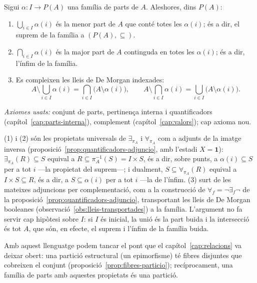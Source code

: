 \begin{proposicio}\label{prop:unio-interseccio-propietats}
Sigui \(\alpha\colon I\to P(A)\) una família de parts de \(A\). Aleshores,
dins \(P(A)\):
\begin{enumerate}
\item \(\bigcup_{i\in I}\alpha(i)\) és la menor part de \(A\) que conté totes
les \(\alpha(i)\); és a dir, el suprem de la família a \((P(A),\subseteq)\).
\item \(\bigcap_{i\in I}\alpha(i)\) és la major part de \(A\) continguda en
totes les \(\alpha(i)\); és a dir, l'ínfim de la família.
\item Es compleixen les lleis de De Morgan indexades:
\[
A\setminus\bigcup_{i\in I}\alpha(i)=\bigcap_{i\in I}\bigl(A\setminus\alpha(i)\bigr),
\qquad
A\setminus\bigcap_{i\in I}\alpha(i)=\bigcup_{i\in I}\bigl(A\setminus\alpha(i)\bigr).
\]
\end{enumerate}
\emph{Axiomes usats:} conjunt de parts, pertinença interna i quantificadors
(capítol~\ref{cap:parts-interna}), complement (capítol~\ref{cap:valors}); cap
axioma nou.
\end{proposicio}

\begin{prova}
(1) i (2) són les propietats universals de \(\exists_{\pi_A}\) i
\(\forall_{\pi_A}\) com a adjunts de la imatge inversa
(proposició~\ref{prop:quantificadors-adjuncio}, amb l'estadi \(X=\mathbf1\)):
\(\exists_{\pi_A}(R)\subseteq S\) equival a \(R\subseteq\pi_A^{-1}(S)=I\times S\),
és a dir, sobre punts, a \(\alpha(i)\subseteq S\) per a tot \(i\) ---la
propietat del suprem---; i dualment, \(S\subseteq\forall_{\pi_A}(R)\) equival
a \(I\times S\subseteq R\), és a dir, a \(S\subseteq\alpha(i)\) per a tot
\(i\) ---la de l'ínfim. (3) surt de les mateixes adjuncions per
complementació, com a la construcció de \(\forall_f=\neg\exists_f\neg\) de la
proposició~\ref{prop:quantificadors-adjuncio}, transportant les lleis de De
Morgan booleanes (observació~\ref{obs:lleis-transportades}) a la família.
L'argument no fa servir cap hipòtesi sobre \(I\): si \(I\) és inicial, la
unió és la part buida i la intersecció és tot \(A\), que són, en efecte, el
suprem i l'ínfim de la família buida.
\end{prova}

Amb aquest llenguatge podem tancar el pont que el capítol~\ref{cap:relacions}
va deixar obert: una partició estructural (un epimorfisme) té fibres
disjuntes que cobreixen el conjunt (proposició~\ref{prop:fibres-particio});
recíprocament, una família de parts amb aquestes propietats és una
partició.


